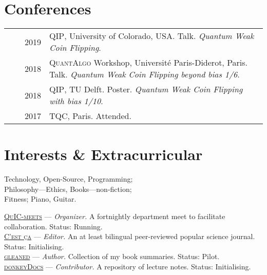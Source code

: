 \documentclass[a4paper,10pt]{article}
\begin{document}
\section{Conferences}
\begin{tabular}{rrp{11cm}}
  & ~~2019 &\textsc{QIP}, University of Colorado, USA. Talk. \emph{Quantum Weak Coin Flipping}. \\
  & ~~2018 &\textsc{QuantAlgo} Workshop, Université Paris-Diderot, Paris. Talk. \emph{Quantum Weak Coin Flipping beyond bias 1/6}. \\  
  & ~~2018 &\textsc{QIP}, TU Delft. Poster. \emph{Quantum Weak Coin Flipping with bias 1/10}. \\
  & ~~2017 &\textsc{TQC}, Paris. Attended.
  \end{tabular}


\section{Interests \& Extracurricular}
Technology, Open-Source, Programming;\\ 
Philosophy---Ethics, Books---non-fiction; \\
Fitness; Piano, Guitar.

\textsc{\href{https://quic-meets.github.io}{QuIC-meets}} --- \emph{Organizer.} {\footnotesize A fortnightly department meet to facilitate collaboration. Status: Running. } \\
\textsc{\href{https://c-est-ca.github.io}{C'est ça}} --- \emph{Editor.} {\footnotesize An at least bilingual peer-reviewed popular science journal. Status: Initialising. }\\
\textsc{\href{https://gleaned.github.io}{gleaned}} --- \emph{Author.} {\footnotesize Collection of my book summaries. Status: Pilot.}\\
\textsc{\href{https://donkeydocs.github.io}{donkeyDocs}} --- \emph{Contributor.} {\footnotesize A repository of lecture notes. Status: Initialising. }\\
\end{document}
